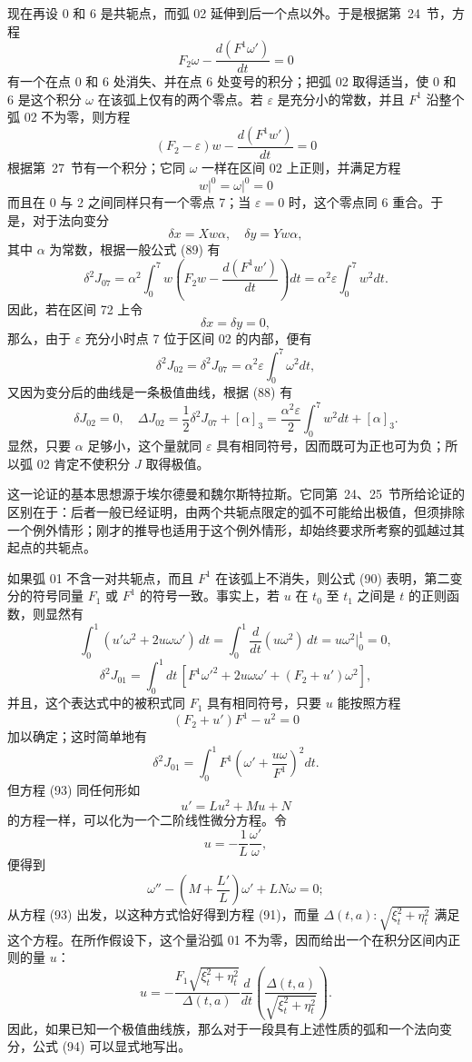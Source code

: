 \documentclass[11pt,a4paper,leqno]{article}
\begin{document}
现在再设 0 和 6 是共轭点，而弧 02 延伸到后一个点以外。于是根据第~24~节，方程
\begin{equation}\tag{91}
F_2\omega-\frac{d(F^1\omega')}{dt}=0
\end{equation}
有一个在点 0 和 6 处消失、并在点 6 处变号的积分；把弧 02 取得适当，使 0 和 6 是这个积分 $\omega$ 在该弧上仅有的两个零点。若 $\varepsilon$ 是充分小的常数，并且 $F^1$ 沿整个弧 02 不为零，则方程
\[
(F_2-\varepsilon)w-\frac{d(F^1w')}{dt}=0
\]
根据第~27~节有一个积分；它同 $\omega$ 一样在区间 02 上正则，并满足方程
\[
\left.w\right|^0=\left.\omega\right|^0=0
\]
而且在 0 与 2 之间同样只有一个零点 7；当 $\varepsilon=0$ 时，这个零点同 6 重合。于是，对于法向变分
\[
\delta x=Xw\alpha,
\quad
\delta y=Yw\alpha,
\]
其中 $\alpha$ 为常数，根据一般公式 (89) 有
\[
\delta^2J_{07}=\alpha^2\int_0^7 w\left(F_2w-\frac{d(F^1w')}{dt}\right)dt
=\alpha^2\varepsilon\int_0^7w^2dt.
\]
因此，若在区间 72 上令
\[
\delta x=\delta y=0,
\]
那么，由于 $\varepsilon$ 充分小时点 7 位于区间 02 的内部，便有
\[
\delta^2J_{02}=\delta^2J_{07}=\alpha^2\varepsilon\int_0^7\omega^2dt,
\]
又因为变分后的曲线是一条极值曲线，根据 (88) 有
\[
\delta J_{02}=0,
\quad
\Delta J_{02}=\frac12\delta^2J_{07}+[\alpha]_3
=\frac{\alpha^2\varepsilon}{2}\int_0^7w^2dt+[\alpha]_3.
\]
显然，只要 $\alpha$ 足够小，这个量就同 $\varepsilon$ 具有相同符号，因而既可为正也可为负；所以弧 02 肯定不使积分 $J$ 取得极值。

这一论证的基本思想源于埃尔德曼和魏尔斯特拉斯。它同第~24、25~节所给论证的区别在于：后者一般已经证明，由两个共轭点限定的弧不可能给出极值，但须排除一个例外情形；刚才的推导也适用于这个例外情形，却始终要求所考察的弧越过其起点的共轭点。

如果弧 01 不含一对共轭点，而且 $F^1$ 在该弧上不消失，则公式 (90) 表明，第二变分的符号同量 $F_1$ 或 $F^1$ 的符号一致。事实上，若 $u$ 在 $t_0$ 至 $t_1$ 之间是 $t$ 的正则函数，则显然有
\[
\int_0^1(u'\omega^2+2u\omega\omega')\,dt
=\int_0^1\frac{d}{dt}(u\omega^2)\,dt
=u\omega^2\bigg|_0^1=0,
\]
\begin{equation}\tag{92}
\delta^2J_{01}=\int_0^1dt\,[F^1\omega'^2+2u\omega\omega'+(F_2+u')\omega^2],
\end{equation}
并且，这个表达式中的被积式同 $F_1$ 具有相同符号，只要 $u$ 能按照方程
\begin{equation}\tag{93}
(F_2+u')F^1-u^2=0
\end{equation}
加以确定；这时简单地有
\begin{equation}\tag{94}
\delta^2J_{01}=\int_0^1F^1\left(\omega'+\frac{u\omega}{F^1}\right)^2dt.
\end{equation}
但方程 (93) 同任何形如
\[
u'=Lu^2+Mu+N
\]
的方程一样，可以化为一个二阶线性微分方程。令
\[
u=-\frac1L\frac{\omega'}{\omega},
\]
便得到
\[
\omega''-\left(M+\frac{L'}L\right)\omega'+LN\omega=0;
\]
从方程 (93) 出发，以这种方式恰好得到方程 (91)，而量 $\Delta(t,a):\sqrt{\xi_t^2+\eta_t^2}$ 满足这个方程。在所作假设下，这个量沿弧 01 不为零，因而给出一个在积分区间内正则的量 $u$：
\[
u=-\frac{F_1\sqrt{\xi_t^2+\eta_t^2}}{\Delta(t,a)}\frac{d}{dt}\left(\frac{\Delta(t,a)}{\sqrt{\xi_t^2+\eta_t^2}}\right).
\]
因此，如果已知一个极值曲线族，那么对于一段具有上述性质的弧和一个法向变分，公式 (94) 可以显式地写出。
\end{document}
